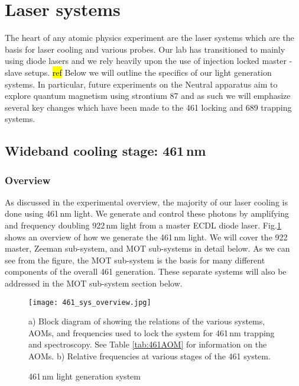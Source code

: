 \section{Laser systems}\label{sec:laser_systems}
\setcounter{footnote}{0}
The heart of any atomic physics experiment are the laser systems which are the basis for laser cooling and various probes.
Our lab has transitioned to mainly using diode lasers and we rely heavily upon the use of injection locked master - slave setups. \hl{ref}
Below we will outline the specifics of our light generation systems.
In particular, future experiments on the Neutral apparatus aim to explore quantum magnetism using strontium 87 and as such we will emphasize several key changes which have been made to the 461 locking and 689 trapping systems.

\subsection{Wideband cooling stage: 461\,nm}
\label{ssec:461sys}

\subsubsection{Overview}
As discussed in the experimental overview, the majority of our laser cooling is done using 461\,nm light. 
We generate and control these photons by amplifying and frequency doubling 922\,nm light from a master ECDL diode laser. 
Fig.\ref{fig:461blockSys} shows an overview of how we generate the 461\,nm light. 
We will cover the 922 master, Zeeman sub-system, and MOT sub-systems in detail below.
As we can see from the figure, the MOT sub-system is the basis for many different components of the overall 461 generation.
These separate systems will also be addressed in the MOT sub-system section below.
	\begin{figure}
		\centerline{
		\texttt{[image: 461\_sys\_overview.jpg]}}
		\caption{461\,nm light generation system}{a) Block diagram of showing the relations of the various systems, AOMs, and frequencies used to lock the system for 461\,nm trapping and spectroscopy. See Table \ref{tab:461AOM} for information on the AOMs. b) Relative frequencies at various stages of the 461 system.}
		\label{fig:461blockSys}
	\end{figure} 

